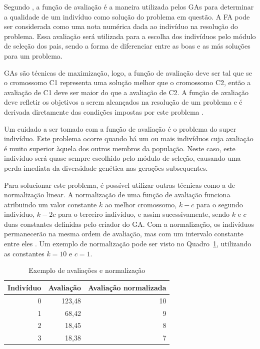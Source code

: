 \documentclass[12pt,oneside,a4paper,english,french,spanish,brazil,]{abntex2}
\begin{document}
Segundo \citet{linden:2008}, a função de avaliação é a maneira utilizada pelos GAs para determinar a qualidade de um indivíduo como solução do problema em questão. A FA pode ser considerada como uma nota numérica dada ao indivíduo na resolução do problema. Essa avaliação será utilizada para a escolha dos indivíduos pelo módulo de seleção dos pais, sendo a forma de diferenciar entre as boas e as más soluções para um problema.

GAs são técnicas de maximização, logo, a função de avaliação deve ser tal que se o cromossomo C1 representa uma solução melhor que o cromossomo C2, então a avaliação de C1 deve ser maior do que a avaliação de C2. A função de avaliação deve refletir os objetivos a serem alcançados na resolução de um problema e é derivada diretamente das condições impostas por este problema \cite{holland:1992}.

Um cuidado a ser tomado com a função de avaliação é o problema do super indivíduo. Este problema ocorre quando há um ou mais indivíduos cuja avaliação é muito superior àquela dos outros membros da população. Neste caso, este indivíduo será quase sempre escolhido pelo módulo de seleção, causando uma perda imediata da diversidade genética nas gerações subsequentes.

Para solucionar este problema, é possível utilizar outras técnicas como a de normalização linear. A normalização de uma função de avaliação funciona atribuindo um valor constante \(k\) ao melhor cromossomo, \(k - c\) para o segundo indivíduo, \(k - 2c\) para o terceiro indivíduo, e assim sucessivamente, sendo \(k\) e \(c\) duas constantes definidas pelo criador do GA. Com a normalização, os indivíduos permanecerão na mesma ordem de avaliação, mas com um intervalo constante entre eles  \cite{linden:2008}. Um exemplo de normalização pode ser visto no Quadro~\ref{tab:Normalizacao_Avaliacao}, utilizando as constantes \(k = 10\) e \(c = 1\).

\begin{table}[tbp]
\centering
\caption{Exemplo de avaliações e normalização}
\label{tab:Normalizacao_Avaliacao}
\begin{tabular}{|r|r|r|}
\hline
\multicolumn{1}{|l|}{\textbf{Indivíduo}} & \multicolumn{1}{l|}{\textbf{Avaliação}} & \multicolumn{1}{l|}{\textbf{Avaliação normalizada}} \\ \hline
0                                        & 123,48                                  & 10                                                  \\ \hline
1                                        & 68,42                                   & 9                                                   \\ \hline
2                                        & 18,45                                   & 8                                                   \\ \hline
3                                        & 18,38                                   & 7                                                   \\ \hline
\end{tabular}
\end{table}
\end{document}
